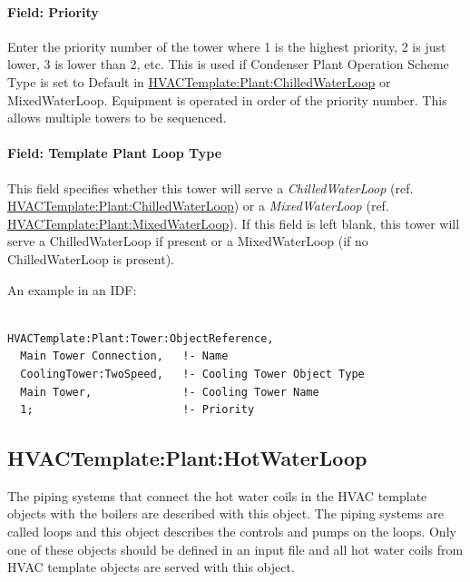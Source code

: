 \paragraph{Field: Priority}\label{field-priority-3}

Enter the priority number of the tower where 1 is the highest priority, 2 is just lower, 3 is lower than 2, etc. This is used if Condenser Plant Operation Scheme Type is set to Default in \hyperref[hvactemplateplantchilledwaterloop]{HVACTemplate:Plant:ChilledWaterLoop} or MixedWaterLoop. Equipment is operated in order of the priority number. This allows multiple towers to be sequenced.

\paragraph{Field: Template Plant Loop Type}\label{field-template-plant-loop-type-1}

This field specifies whether this tower will serve a \emph{ChilledWaterLoop} (ref. \hyperref[hvactemplateplantchilledwaterloop]{HVACTemplate:Plant:ChilledWaterLoop}) or a \emph{MixedWaterLoop} (ref. \hyperref[hvactemplateplantmixedwaterloop]{HVACTemplate:Plant:MixedWaterLoop}). If this field is left blank, this tower will serve a ChilledWaterLoop if present or a MixedWaterLoop (if no ChilledWaterLoop is present).

An example in an IDF:

\begin{lstlisting}

HVACTemplate:Plant:Tower:ObjectReference,
  Main Tower Connection,   !- Name
  CoolingTower:TwoSpeed,   !- Cooling Tower Object Type
  Main Tower,              !- Cooling Tower Name
  1;                       !- Priority
\end{lstlisting}

\subsection{HVACTemplate:Plant:HotWaterLoop}\label{hvactemplateplanthotwaterloop}

The piping systems that connect the hot water coils in the HVAC template objects with the boilers are described with this object. The piping systems are called loops and this object describes the controls and pumps on the loops. Only one of these objects should be defined in an input file and all hot water coils from HVAC template objects are served with this object.

